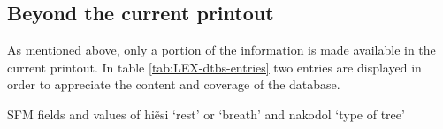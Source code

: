 \subsection{Beyond the current printout}
\label{sec:LEX-beyonf}

As mentioned above,  only a portion of the information is made available in
the current printout. In table \ref{tab:LEX-dtbs-entries}  two 
entries are displayed
in order to appreciate the content and coverage of  the database. 




\begin{table}
\caption{SFM fields and values of   {\M hiẽsi} `rest' or `breath' and
{\M nakodol}  `type of tree'  \label{tab:LEX-dtbs-entries}}
\centering
{}
\end{table}
